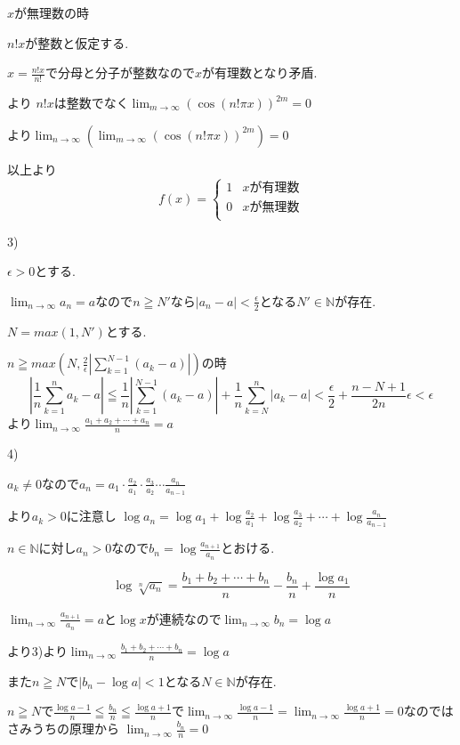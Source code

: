 \documentclass{jsarticle}
\begin{document}
$x$が無理数の時

$n!x$が整数と仮定する.

$x=\frac{n!x}{n!}$で分母と分子が整数なので$x$が有理数となり矛盾.

より
$n!x$は整数でなく$\displaystyle\lim_{m\to \infty} (\cos(n!\pi x))^{2m} = 0$

より$\displaystyle\lim_{n\to \infty}(\lim_{m\to \infty} (\cos(n!\pi x))^{2m}) = 0$

以上より
\[f(x) = \begin{cases}
1 & xが有理数 \\
0 & xが無理数 \\
\end{cases}\]

3)

$\epsilon > 0$とする.

$\displaystyle\lim_{n\to \infty}a_n=a$なので$n\geqq N'$なら$|a_n-a|<\frac{\epsilon}{2}$となる$N'\in \mathbb{N}$が存在.

$N=max(1,N')$とする.

$n\geqq max(N,\frac{2}{\epsilon}|\sum_{k=1}^{N-1}(a_k-a)|)$の時
\[
|\frac{1}{n}\sum_{k=1}^n a_k - a| \leqq \frac{1}{n}|\sum_{k=1}^{N-1}(a_k-a)|+\frac{1}{n}\sum_{k=N}^{n}|a_k-a|<\frac{\epsilon}{2} + \frac{n-N+1}{2n}\epsilon<\epsilon
\]
より$\displaystyle\lim_{n\to \infty}\frac{a_1+a_2+\cdots+a_n}{n}=a$

4)

$a_k\neq0$なので$a_n=a_1\cdot \frac{a_2}{a_1}\cdot \frac{a_3}{a_2}\cdots \frac{a_n}{a_{n-1}}$

より$a_k>0$に注意し
$\log a_n = \log a_1 + \log \frac{a_2}{a_1}+\log \frac{a_3}{a_2}+\cdots +\log \frac{a_n}{a_{n-1}}$

$n\in\mathbb{N}$に対し$a_n > 0$なので$b_n=\log \frac{a_{n+1}}{a_n}$とおける.

\[\log \sqrt[n]{a_n}=\frac{b_1+b_2+\cdots +b_n}{n} - \frac{b_n}{n}+\frac{\log a_1}{n}\]

$\displaystyle\lim_{n\to \infty}\frac{a_{n+1}}{a_n}=a$と$\log x$が連続なので$\displaystyle\lim_{n\to \infty}b_n=\log a$

より3)より$\displaystyle\lim _{n\to \infty}\frac{b_1+b_2+\cdots +b_n}{n} = \log a$

また$n\geqq N$で$|b_n - \log a|<1$となる$N\in\mathbb{N}$が存在.

$n\geqq N$で$\frac{\log a -1}{n}\leqq \frac{b_n}{n} \leqq \frac{\log a+1}{n}$で$\displaystyle\lim_{n\to\infty}\frac{\log a -1}{n} = \lim_{n\to\infty}\frac{\log a +1}{n}=0$なのではさみうちの原理から
$\displaystyle\lim_{n\to\infty} \frac{b_n}{n} = 0$
\end{document}
